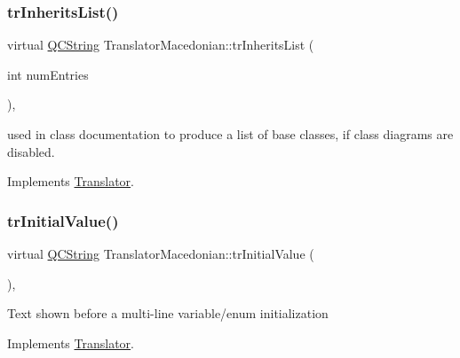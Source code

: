 \mbox{\label{class_translator_macedonian_a6e147630db304f0ab734640b3fcec043}} 
\subsubsection{\texorpdfstring{trInheritsList()}{trInheritsList()}}
{\footnotesize\ttfamily virtual \mbox{\hyperlink{class_q_c_string}{Q\+C\+String}} Translator\+Macedonian\+::tr\+Inherits\+List (\begin{DoxyParamCaption}\item[{int}]{num\+Entries }\end{DoxyParamCaption})\hspace{0.3cm}{\ttfamily [inline]}, {\ttfamily [virtual]}}

used in class documentation to produce a list of base classes, if class diagrams are disabled. 

Implements \mbox{\hyperlink{class_translator}{Translator}}.

\mbox{\label{class_translator_macedonian_a065dfb47780c1725440b514f3591f6ad}} 
\subsubsection{\texorpdfstring{trInitialValue()}{trInitialValue()}}
{\footnotesize\ttfamily virtual \mbox{\hyperlink{class_q_c_string}{Q\+C\+String}} Translator\+Macedonian\+::tr\+Initial\+Value (\begin{DoxyParamCaption}{ }\end{DoxyParamCaption})\hspace{0.3cm}{\ttfamily [inline]}, {\ttfamily [virtual]}}

Text shown before a multi-\/line variable/enum initialization 

Implements \mbox{\hyperlink{class_translator}{Translator}}.

\mbox{\label{class_translator_macedonian_a42edf39ef62af7e307fb11b8a772b1a7}} 
